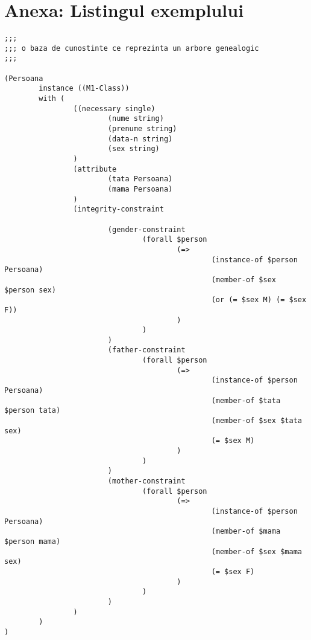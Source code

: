 \documentclass{article}
\begin{document}
\section{Anexa: Listingul exemplului}
{\scriptsize
\begin{verbatim}
;;;
;;; o baza de cunostinte ce reprezinta un arbore genealogic
;;;

(Persoana
        instance ((M1-Class))
        with (
                ((necessary single)
                        (nume string)
                        (prenume string)
                        (data-n string)
                        (sex string)
                )
                (attribute
                        (tata Persoana)
                        (mama Persoana)
                )
                (integrity-constraint

                        (gender-constraint
                                (forall $person
                                        (=>
                                                (instance-of $person Persoana)
                                                (member-of $sex $person sex) 
                                                (or (= $sex M) (= $sex F))
                                        )
                                )
                        )
                        (father-constraint
                                (forall $person
                                        (=>
                                                (instance-of $person Persoana)
                                                (member-of $tata $person tata)
                                                (member-of $sex $tata sex)
                                                (= $sex M)
                                        )
                                )
                        )
                        (mother-constraint
                                (forall $person
                                        (=>
                                                (instance-of $person Persoana)
                                                (member-of $mama $person mama)
                                                (member-of $sex $mama sex)
                                                (= $sex F)
                                        )
                                )
                        )
                )
        )
)


\end{verbatim}}
\end{document}
